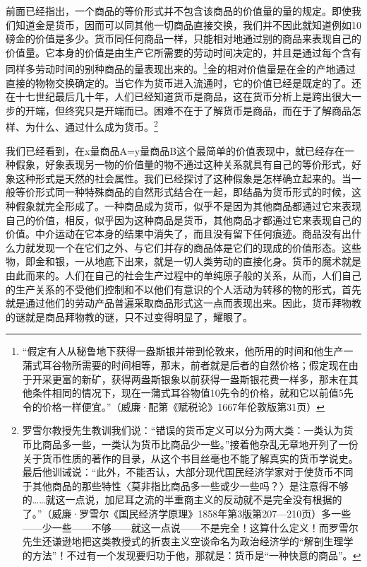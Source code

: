 \documentclass{ctexbook}
\begin{document}
前面已经指出，一个商品的等价形式并不包含该商品的价值量的量的规定。即使我们知道金是货币，因而可以同其他一切商品直接交换，我们并不因此就知道例如10磅金的价值是多少。货币同任何商品一样，只能相对地通过别的商品来表现自己的价值量。它本身的价值是由生产它所需要的劳动时间决定的，并且是通过每个含有同样多劳动时间的别种商品的量表现出来的。\footnote{“假定有人从秘鲁地下获得一盎斯银并带到伦敦来，他所用的时间和他生产一蒲式耳谷物所需要的时间相等，那末，前者就是后者的自然价格；假定现在由于开采更富的新矿，获得两盎斯银象以前获得一盎斯银花费一样多，那末在其他条件相同的情况下，现在一蒲式耳谷物值10先令的价格，就和它以前值5先令的价格一样便宜。”（威廉·配第《赋税论》1667年伦敦版第31页）}金的相对价值量是在金的产地通过直接的物物交换确定的。当它作为货币进入流通时，它的价值已经是既定的了。还在十七世纪最后几十年，人们已经知道货币是商品，这在货币分析上是跨出很大一步的开端，但终究只是开端而已。困难不在于了解货币是商品，而在于了解商品怎样、为什么、通过什么成为货币。\footnote{罗雪尔教授先生教训我们说：“错误的货币定义可以分为两大类：一类认为货币比商品多一些，一类认为货币比商品少一些。”接着他杂乱无章地开列了一份关于货币性质的著作的目录，从这个书目丝毫也不能了解真实的货币学说史。最后他训诫说：“此外，不能否认，大部分现代国民经济学家对于使货币不同于其他商品的那些特性〈莫非指比商品多一些或少一些吗？〉是注意得不够的……就这一点说，加尼耳之流的半重商主义的反动就不是完全没有根据的了。”（威廉·罗雪尔《国民经济学原理》1858年第3版第207—210页）多一些——少一些——不够——就这一点说——不是完全！这算什么定义！而罗雪尔先生还谦逊地把这类教授式的折衷主义空谈命名为政治经济学的“解剖生理学的方法”！不过有一个发现要归功于他，那就是：货币是“一种快意的商品”。}

我们已经看到，在x量商品A=y量商品B这个最简单的价值表现中，就已经存在一种假象，好象表现另一物的价值量的物不通过这种关系就具有自己的等价形式，好象这种形式是天然的社会属性。我们已经探讨了这种假象是怎样确立起来的。当一般等价形式同一种特殊商品的自然形式结合在一起，即结晶为货币形式的时候，这种假象就完全形成了。一种商品成为货币，似乎不是因为其他商品都通过它来表现自己的价值，相反，似乎因为这种商品是货币，其他商品才都通过它来表现自己的价值。中介运动在它本身的结果中消失了，而且没有留下任何痕迹。商品没有出什么力就发现一个在它们之外、与它们并存的商品体是它们的现成的价值形态。这些物，即金和银，一从地底下出来，就是一切人类劳动的直接化身。货币的魔术就是由此而来的。人们在自己的社会生产过程中的单纯原子般的关系，从而，人们自己的生产关系的不受他们控制和不以他们有意识的个人活动为转移的物的形式，首先就是通过他们的劳动产品普遍采取商品形式这一点而表现出来。因此，货币拜物教的谜就是商品拜物教的谜，只不过变得明显了，耀眼了。
\end{document}
